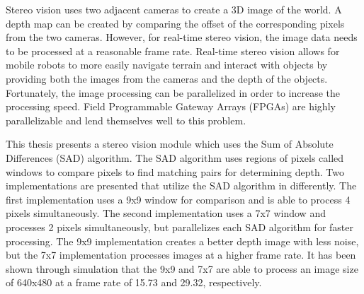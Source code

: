 Stereo vision uses two adjacent cameras to create a 3D image of the world. A depth map can be created by comparing the offset of the corresponding pixels from the two cameras. However, for real-time stereo vision, the image data needs to be processed at a reasonable frame rate. Real-time stereo vision allows for mobile robots to more easily navigate terrain and interact with objects by providing both the images from the cameras and the depth of the objects. Fortunately, the image processing can be parallelized in order to increase the processing speed. Field Programmable Gateway Arrays (FPGAs) are highly parallelizable and lend themselves well to this problem.

This thesis presents a stereo vision module which uses the Sum of Absolute Differences (SAD) algorithm. The SAD algorithm uses regions of pixels called windows to compare pixels to find matching pairs for determining depth. Two implementations are presented that utilize the SAD algorithm in differently. The first implementation uses a 9x9 window for comparison and is able to process 4 pixels simultaneously. The second implementation uses a 7x7 window and processes 2 pixels simultaneously, but parallelizes each SAD algorithm for faster processing. The 9x9 implementation creates a better depth image with less noise, but the 7x7 implementation processes images at a higher frame rate. It has been shown through simulation that the 9x9 and 7x7 are able to process an image size of 640x480 at a frame rate of 15.73 and 29.32, respectively.


%



